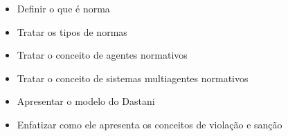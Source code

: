 \cite{amodelmultiagentsystemdynamicrelationship}
\cite{modelingnormsforautnomousagent}
\cite{dastaniframework}
\begin{itemize}
    \item Definir o que é norma
    \item Tratar os tipos de normas
    \item Tratar o conceito de agentes normativos
    \item Tratar o conceito de sistemas multiagentes normativos 
    \item Apresentar o modelo do Dastani
    \item Enfatizar como ele apresenta os conceitos de violação e sanção
\end{itemize}